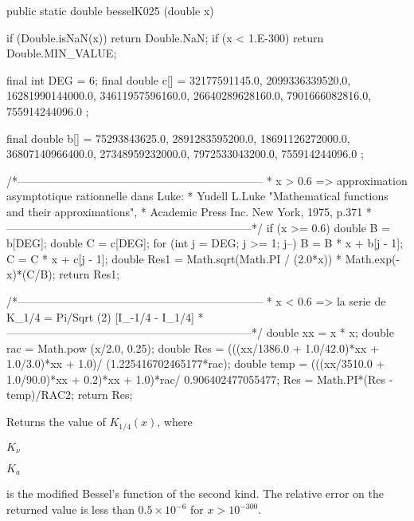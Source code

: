 \begin{code}

   public static double besselK025 (double x)\begin{hide} {
      if (Double.isNaN(x))
         return Double.NaN;
      if (x < 1.E-300)
         return Double.MIN_VALUE;

      final int DEG = 6;
      final double c[] = {
         32177591145.0,
         2099336339520.0,
         16281990144000.0,
         34611957596160.0,
         26640289628160.0,
         7901666082816.0,
         755914244096.0
      };

      final double b[] = {
         75293843625.0,
         2891283595200.0,
         18691126272000.0,
         36807140966400.0,
         27348959232000.0,
         7972533043200.0,
         755914244096.0
      };

      /*------------------------------------------------------------------
       * x > 0.6 => approximation asymptotique rationnelle dans Luke:
       * Yudell L.Luke "Mathematical functions and their approximations",
       * Academic Press Inc. New York, 1975, p.371
       *------------------------------------------------------------------*/
      if (x >= 0.6) {
         double B = b[DEG];
         double C = c[DEG];
         for (int j = DEG; j >= 1; j--) {
            B = B * x + b[j - 1];
            C = C * x + c[j - 1];
         }
         double Res1 = Math.sqrt(Math.PI / (2.0*x)) * Math.exp(-x)*(C/B);
         return Res1;
      }

      /*------------------------------------------------------------------
       * x < 0.6 => la serie de K_{1/4} = Pi/Sqrt (2) [I_{-1/4} - I_{1/4}]
       *------------------------------------------------------------------*/
      double xx = x * x;
      double rac = Math.pow (x/2.0, 0.25);
      double Res = (((xx/1386.0 + 1.0/42.0)*xx + 1.0/3.0)*xx + 1.0)/
              (1.225416702465177*rac);
      double temp = (((xx/3510.0 + 1.0/90.0)*xx + 0.2)*xx + 1.0)*rac/
                     0.906402477055477;
      Res = Math.PI*(Res - temp)/RAC2;
      return Res;
   }\end{hide}
\end{code}
  \begin{tabb} Returns the value of $K_{1/4}(x)$, where \begin{latexonly}
 $K_{\nu}$\end{latexonly}\begin{htmlonly}$K_a$ \end{htmlonly} is the modified
  Bessel's function of the second kind.
  The relative error on the returned value is less than
  $0.5\times 10^{-6}$ for $x > 10^{-300}$.
 \end{tabb}
